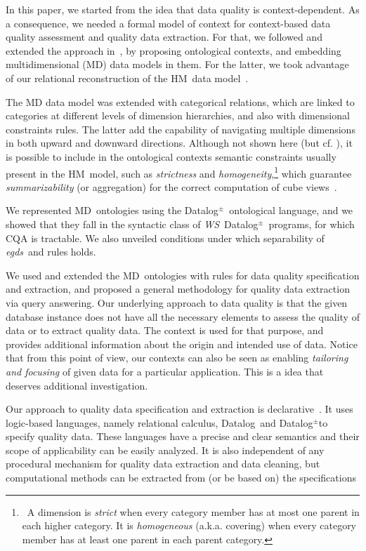 \documentclass[format=acmsmall, review=false, screen=true]{acmart}
\newcommand{\da}{Datalog}
\newcommand{\dpm}{{Datalog}$^\pm$}
\newcommand{\m}{\;\!\!}
\newcommand{\WS}{{\em W\m{}S}}
\newcommand{\hm}{HM}
\newcommand{\md}{MD}
\newcommand{\egds}{{\em egds}}
\newcommand{\red}[1]{{#1}}
\begin{document}
In this paper, we started from the idea that data quality is context-dependent. As a consequence, we needed a formal model of context for context-based data quality assessment and quality data extraction. For that, we followed and extended the approach in~\cite{bertossi-brite,bertossi16}, by proposing ontological contexts, and embedding multidimensional (MD) data models in them.
For the latter, we took advantage of our relational reconstruction of the \hm \ data model~\cite{hurtado-pods,hurtado-acm}.

 The MD data model was extended with categorical relations, which are linked to categories at different levels of dimension hierarchies, and also with dimensional constraints rules. The latter add the capability of navigating multiple dimensions in both upward and downward directions. Although not shown here (but cf. \cite{milaniThesis}), it is possible to include in the ontological contexts
semantic constraints usually present in  the \hm \ model, such as {\em strictness} and {\em homogeneity},\footnote{\ A dimension is {\em strict} when every category member has at most one parent in each higher category. It is {\em homogeneous} (a.k.a. covering) when every category member has at least one parent in each parent category.} which guarantee {\em summarizability} (or aggregation) for the correct computation of cube views~\cite{hurtado-pods}.




We represented \md \ ontologies using the \dpm \ ontological language, and we showed that they fall in the syntactic class of \WS \ \dpm \ programs, for which CQA is tractable. We also unveiled conditions under which separability of \egds \ and rules holds.


We used and extended  the \md \ ontologies with rules for data quality specification and extraction, and proposed a general methodology for quality data extraction via query answering.
Our underlying approach to data quality is that the given database instance does not have all the necessary elements to assess the quality of data or to extract quality data. The context is used for that purpose, and provides additional information about the origin and intended use of data. Notice that from this point of view, our contexts  can also be seen as enabling {\em tailoring and focusing} of given data for a particular application. This is a idea that deserves additional investigation.

\red{Our approach to quality data specification and extraction is declarative~\cite{geerts,bertossi13}. It uses logic-based languages, namely relational calculus, \da \ and \dpm to specify quality data. These languages have a precise and clear semantics and their scope of applicability can be easily analyzed. It is also independent of any procedural mechanism for quality data extraction and data cleaning, but computational methods can be extracted from (or be based on) the specifications}
\end{document}
